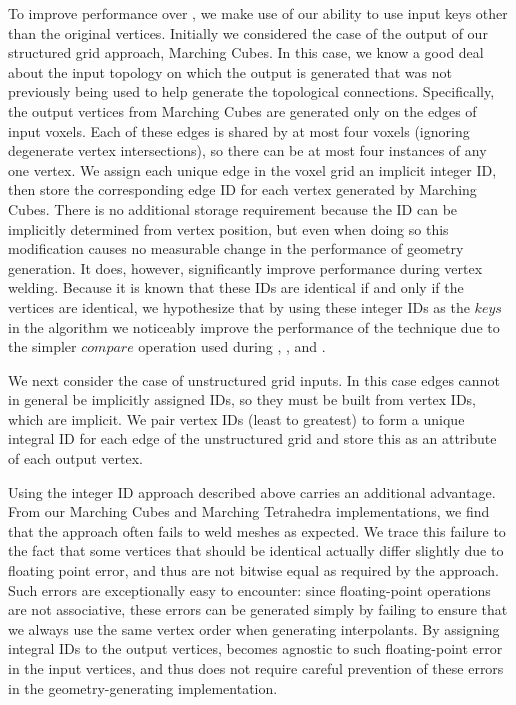 \documentclass[10pt,journal,cspaper,compsoc]{IEEEtran}
\begin{document}
\label{sec:IntegralIDs}
To improve performance over , we make use of our ability to use input keys other than the original vertices. Initially we considered the case of the output of our structured grid
approach, Marching Cubes. In this case, we know a good deal about the input topology on which the output is generated that was not previously being used to help generate the topological connections. Specifically, the output vertices from Marching Cubes are generated only on the edges of input voxels. Each of these edges is shared by at most four voxels (ignoring degenerate vertex intersections), so there can be at most four instances of any one vertex.
We assign each unique edge in the voxel grid an implicit integer ID, then store the corresponding edge ID for each vertex generated by Marching Cubes. There is no additional storage requirement because the ID can be implicitly determined from vertex position, but even when doing so this modification causes no measurable change in the performance of geometry generation. It does, however, significantly improve performance during vertex welding. Because it is known that these IDs are identical if and only if the vertices are identical, we hypothesize that by using these integer IDs as the $keys$ in the  algorithm we noticeably improve the performance of the technique due to the simpler $compare$ operation used during , , and . 

We next consider the case of unstructured grid inputs. In this case edges cannot in general be implicitly assigned IDs, so they must be built from vertex IDs, which are implicit. We pair vertex IDs (least to greatest) to form a unique integral ID for each edge of the unstructured grid and store this as an attribute of each output vertex. 

Using the integer ID approach described above carries an additional advantage. From our Marching Cubes and Marching Tetrahedra implementations, we find that the  approach often fails to weld meshes as expected. We trace this failure to the fact that some vertices that should be identical actually differ slightly due to floating point error, and thus are not bitwise equal as required by the  approach. Such errors are exceptionally easy to encounter: since floating-point operations are not associative, these errors can be generated simply by failing to ensure that we always use the same vertex order when generating interpolants. By assigning integral IDs to the output vertices,  becomes agnostic to such floating-point error in the input vertices, and thus does not require careful prevention of these errors in the geometry-generating implementation.
\end{document}
